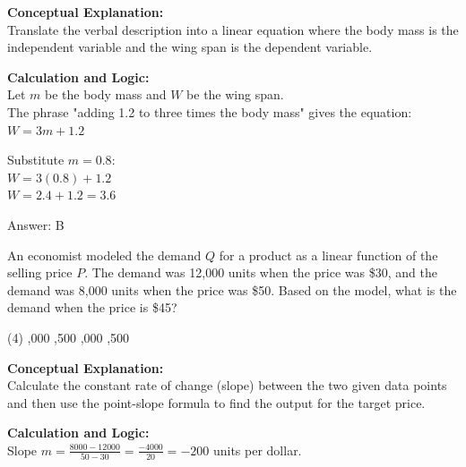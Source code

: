 \documentclass[11pt,paper=a4,answers]{exam}
\begin{document}
\begin{questions}
\begin{solution}
\textbf{Conceptual Explanation:} \\
Translate the verbal description into a linear equation where the body mass is the independent variable and the wing span is the dependent variable.

\vspace{20pt}

\textbf{Calculation and Logic:} \\
Let $m$ be the body mass and $W$ be the wing span. \\
The phrase "adding 1.2 to three times the body mass" gives the equation: \\
$W = 3m + 1.2$

\vspace{10pt}

Substitute $m = 0.8$: \\
$W = 3(0.8) + 1.2$ \\
$W = 2.4 + 1.2 = 3.6$

\vspace{25pt}

Answer: \colorbox{yellow!100}{B}
\end{solution}

\vspace{40pt}

\question
An economist modeled the demand $Q$ for a product as a linear function of the selling price $P$. The demand was 12,000 units when the price was \$30, and the demand was 8,000 units when the price was \$50. Based on the model, what is the demand when the price is \$45?
\begin{tasks}(4)
    ,000
    ,500
    ,000
    ,500
\end{tasks}

\begin{solution}
\textbf{Conceptual Explanation:} \\
Calculate the constant rate of change (slope) between the two given data points and then use the point-slope formula to find the output for the target price.

\vspace{20pt}

\textbf{Calculation and Logic:} \\
Slope $m = \frac{8000 - 12000}{50 - 30} = \frac{-4000}{20} = -200$ units per dollar.

\vspace{10pt}


\end{solution}
\end{questions}
\end{document}
